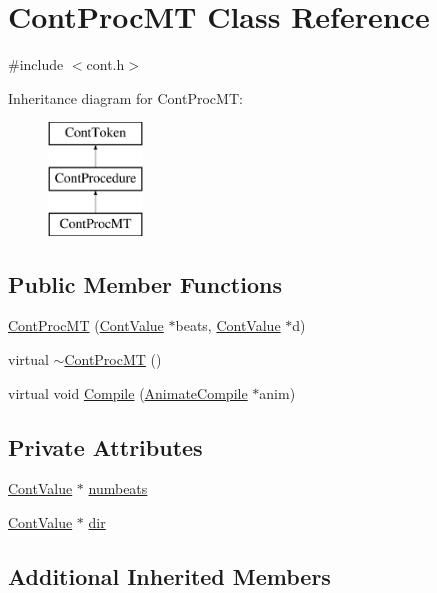 \hypertarget{a00078}{\section{Cont\-Proc\-M\-T Class Reference}
\label{a00078}
}


{\ttfamily \#include $<$cont.\-h$>$}

Inheritance diagram for Cont\-Proc\-M\-T\-:\begin{figure}[H]
\begin{center}
\leavevmode
\includegraphics[height=3.000000cm]{a00078}
\end{center}
\end{figure}
\subsection*{Public Member Functions}
\begin{DoxyCompactItemize}
\item 
\hyperlink{a00078_a00d350315162d943bce38c090a7061ea}{Cont\-Proc\-M\-T} (\hyperlink{a00086}{Cont\-Value} $\ast$beats, \hyperlink{a00086}{Cont\-Value} $\ast$d)
\item 
virtual \hyperlink{a00078_ac07e77f8b65e03ed5cef623195ce01c2}{$\sim$\-Cont\-Proc\-M\-T} ()
\item 
virtual void \hyperlink{a00078_a962aca7f48111ff35165fef9e30b7267}{Compile} (\hyperlink{a00007}{Animate\-Compile} $\ast$anim)
\end{DoxyCompactItemize}
\subsection*{Private Attributes}
\begin{DoxyCompactItemize}
\item 
\hyperlink{a00086}{Cont\-Value} $\ast$ \hyperlink{a00078_a5a82bf27f6fb31379f6cdabcc4c5c8a9}{numbeats}
\item 
\hyperlink{a00086}{Cont\-Value} $\ast$ \hyperlink{a00078_a912c5f4ac526d2111c72a1c67c041546}{dir}
\end{DoxyCompactItemize}
\subsection*{Additional Inherited Members}


